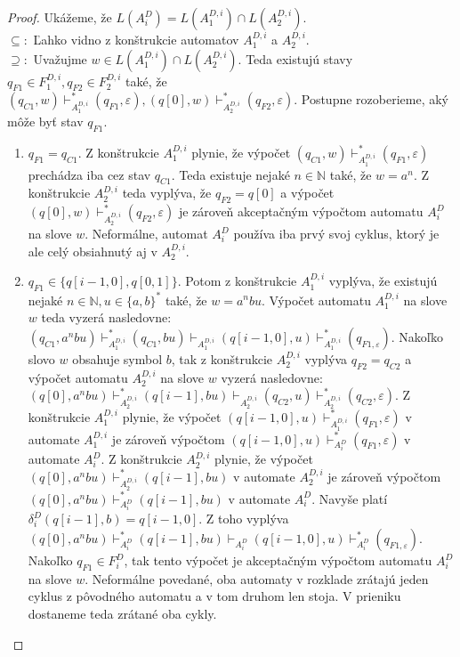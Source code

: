\begin{proof}
Ukážeme, že $ L(A_i^D) = L(A_1^{D,i}) \cap L(A_2^{D,i}) $. \\
$ \subseteq: $ Ľahko vidno z konštrukcie automatov $ A_1^{D,i}$ a $ A_2^{D,i} $. \\
$ \supseteq: $ Uvažujme $ w \in L(A_1^{D,i}) \cap L(A_2^{D,i}) $. Teda existujú stavy $ q_{F1} \in F_1^{D,i}, q_{F2} \in F_2^{D,i}$ také, že $ (q_{C1},w) \vdash_{A_1^{D,i}}^* (q_{F1}, \varepsilon), (q[0],w) \vdash_{A_2^{D,i}}^* (q_{F2}, \varepsilon)$. Postupne rozoberieme, aký môže byť stav $ q_{F1} $.
\begin{enumerate}
\item $ q_{F1} = q_{C1} $. Z konštrukcie $ A_1^{D,i} $ plynie, že výpočet $ (q_{C1},w) \vdash_{A_1^{D,i}}^* (q_{F1}, \varepsilon)$ prechádza iba cez stav $ q_{C1} $. Teda existuje nejaké $ n \in \mathbb{N} $ také, že $ w=a^n $. Z konštrukcie $ A_2^{D,i} $ teda vyplýva, že $ q_{F2} = q[0] $ a výpočet $ (q[0],w) \vdash_{A_2^{D,i}}^* (q_{F2}, \varepsilon) $ je zároveň akceptačným výpočtom automatu $ A_i^D $ na slove $ w $. Neformálne, automat $ A_i^D $ používa iba prvý svoj cyklus, ktorý je ale celý obsiahnutý aj v $ A_2^{D,i} $.
\item $ q_{F1} \in \lbrace q[i-1,0],q[0,1] \rbrace $. Potom z konštrukcie $ A_1^{D,i} $ vyplýva, že existujú nejaké $ n \in \mathbb{N}, u \in \lbrace a,b \rbrace^* $ také, že $ w = a^nbu $. Výpočet automatu $ A_1^{D,i} $ na slove $ w $ teda vyzerá nasledovne: $ (q_{C1},a^nbu) \vdash_{A_1^{D,i}}^* (q_{C1},bu) \vdash_{A_1^{D,i}} (q[i-1,0],u) \vdash_{A_1^{D,i}}^* (q_{F1, \varepsilon}) $. Nakoľko slovo $ w $ obsahuje symbol $ b $, tak z konštrukcie $ A_2^{D,i} $ vyplýva $ q_{F2} = q_{C2} $ a výpočet automatu $ A_2^{D,i} $ na slove $ w $ vyzerá nasledovne: $ (q[0],a^nbu) \vdash_{A_2^{D,i}}^* (q[i-1],bu) \vdash_{A_2^{D,i}} (q_{C2},u) \vdash_{A_2^{D,i}}^* (q_{C2},\varepsilon)$. Z konštrukcie $ A_1^{D,i} $ plynie, že výpočet $ (q[i-1,0],u) \vdash_{A_1^{D,i}}^* (q_{F1}, \varepsilon) $ v automate $ A_1^{D,i} $ je zároveň výpočtom $ (q[i-1,0],u) \vdash_{A_i^D}^* (q_{F1}, \varepsilon) $ v automate $  A_i^D $. Z konštrukcie $ A_2^{D,i} $ plynie, že výpočet $ (q[0],a^nbu) \vdash_{A_2^{D,i}}^* (q[i-1],bu) $ v automate $ A_2^{D,i} $ je zároveň výpočtom $ (q[0],a^nbu) \vdash_{A_i^D}^* (q[i-1],bu) $ v automate $  A_i^D $. Navyše platí $ \delta_i^D(q[i-1],b) = q[i-1,0] $. Z toho vyplýva $ (q[0],a^nbu) \vdash_{A_i^D}^* (q[i-1],bu) \vdash_{A_i^D} (q[i-1,0],u) \vdash_{A_i^D}^* (q_{F1, \varepsilon}) $. Nakoľko $ q_{F1} \in F_i^D $, tak tento výpočet je akceptačným výpočtom automatu $ A_i^D $ na slove $ w $. Neformálne povedané, oba automaty v rozklade zrátajú jeden cyklus z pôvodného automatu a v tom druhom len stoja. V prieniku dostaneme teda zrátané oba cykly.
\end{enumerate}


\end{proof}
